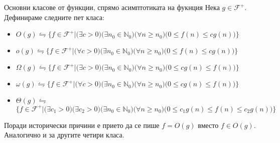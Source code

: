 \begin{boxdefinition}{Основни класове от функции, спрямо асимптотиката на фукнция}{}\label{bdef-asymp-classes}
	Нека $g\in\mathscr{F}^+$. Дефинираме следните пет класа:
	\begin{itemize}
		\item $O(g)\leftrightharpoons\{f\in\mathscr{F}^+|\big(\exists c>0\big)\big(\exists n_0\in\mathbb{N}_0\big)\big(\forall n\ge n_0\big)\big(0\le f(n)\le cg(n)\big)\}$
		\item $o(g)\leftrightharpoons\{f\in\mathscr{F}^+|\big(\forall c>0\big)\big(\exists n_0\in\mathbb{N}_0\big)\big(\forall n\ge n_0\big)\big(0\le f(n)\le cg(n)\big)\}$
		\item $\Omega(g)\leftrightharpoons\{f\in\mathscr{F}^+|\big(\exists c>0\big)\big(\exists n_0\in\mathbb{N}_0\big)\big(\forall n\ge n_0\big)\big(0\le cg(n)\le f(n)\big)\}$
		\item $\omega(g)\leftrightharpoons\{f\in\mathscr{F}^+|\big(\forall c>0\big)\big(\exists n_0\in\mathbb{N}_0\big)\big(\forall n\ge n_0\big)\big(0\le cg(n)\le f(n)\big)\}$
		\item $\Theta(g)\leftrightharpoons$\\$\{f\in\mathscr{F}^+|\big(\exists c_1>0\big)\big(\exists c_2>0\big)\big(\exists n_0\in\mathbb{N}_0\big)\big(\forall n\ge n_0\big)\big(0\le c_1g(n)\le f(n)\le c_2g(n)\big)\}$
	\end{itemize}
	
\end{boxdefinition}

\begin{remark*}
	Поради исторически причини е прието да се пише $f=O(g)$ вместо $f\in O(g)$. Аналогично и за другите четири класа.
\end{remark*}\newpage

